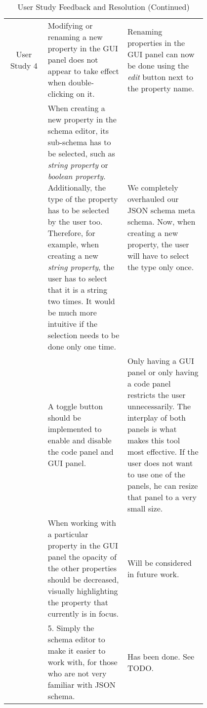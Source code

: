\begin{table*}

    \centering
    \small %
    \setlength{\extrarowheight}{5pt} %
    \renewcommand{\arraystretch}{1.5} %
    \begin{tabular}{|c|p{0.4\linewidth}|p{0.4\linewidth}|}
        \hline
        User Study 4 & Modifying or renaming a new property in the GUI panel does not appear to take effect when double-clicking on it. & 
        Renaming properties in the GUI panel can now be done using the \textit{edit} button next to the property name. \\
        \cline{2-3}
        & When creating a new property in the schema editor, its sub-schema has to be selected, such as \textit{string property} or \textit{boolean property}. 
        Additionally, the type of the property has to be selected by the user too. 
        Therefore, for example, when creating a new \textit{string property}, the user has to select that it is a string two times. 
        It would be much more intuitive if the selection needs to be done only one time.  
        & We completely overhauled our JSON schema meta schema. 
        Now, when creating a new property, the user will have to select the type only once. \\
        \cline{2-3}
        & A toggle button should be implemented to enable and disable the code panel and GUI panel. 
        & Only having a GUI panel or only having a code panel restricts the user unnecessarily.
        The interplay of both panels is what makes this tool most effective.
         If the user does not want to use one of the panels, he can resize that panel to a very small size.  \\
        \cline{2-3}
        & When working with a particular property in the GUI panel the opacity of the other properties should be decreased, visually highlighting the property that currently is in focus. & Will be considered in future work. \\
        \cline{2-3}
        & 5. Simply the schema editor to make it easier to work with, for those who are not very familiar with JSON schema. &
        Has been done. See TODO. \\
        \hline

    \end{tabular}
    \caption{User Study Feedback and Resolution (Continued)} \label{tab:user_study4}

\end{table*}

